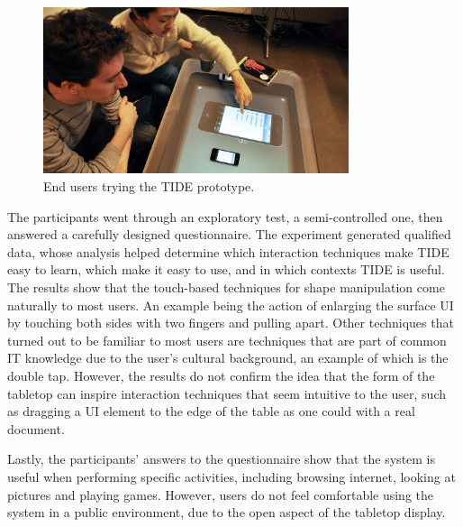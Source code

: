 \begin{figure}[htb]
  \centering
    \includegraphics[width=0.8\textwidth]{images/368}
  \caption{End users trying the TIDE prototype.}
  \label{fig:368}
\end{figure}

The participants went through an exploratory test, a semi-controlled one, then answered a carefully designed questionnaire. The experiment generated qualified data, whose analysis helped determine which interaction techniques make TIDE easy to learn, which make it easy to use, and in which contexts TIDE is useful.
The results show that the touch-based techniques for shape manipulation come naturally to most users.
An example being the action of enlarging the surface UI by touching both sides with two fingers and pulling apart.
Other techniques that turned out to be familiar to most users are techniques that are part of common IT knowledge due to the user's cultural background, an example of which is the double tap.
However, the results do not confirm the idea that the form of the tabletop can inspire interaction techniques that seem intuitive to the user, such as dragging a UI element to the edge of the table as one could with a real document.

Lastly, the participants' answers to the questionnaire show that the system is useful when performing specific activities, including browsing internet, looking at pictures and playing games.
However, users do not feel comfortable using the system in a public environment, due to the open aspect of the tabletop display.

%

